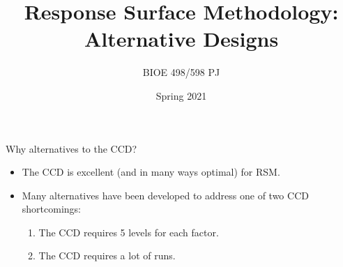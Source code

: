 \documentclass[9pt]{beamer}
\title{Response Surface Methodology:\\Alternative Designs}
\author{BIOE 498/598 PJ}
\date{Spring 2021}
\begin{document}
\frame{\titlepage}

\begin{frame}{Why alternatives to the CCD?}

\begin{itemize}
	\item The CCD is excellent (and in many ways optimal) for RSM.
	\item Many alternatives have been developed to address one of two CCD shortcomings:
	\begin{enumerate}
		\item The CCD requires 5 levels for each factor.
		\item The CCD requires a lot of runs.
	\end{enumerate}
\end{itemize}
	
\end{frame}
\end{document}
